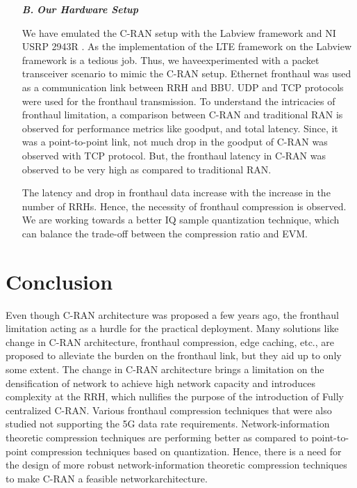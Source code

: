 \begin{multicols}{2}
\begin{itemize}
None of the above mentioned works have compared the performance of C-RAN with the traditional RAN. We have analyzed the performance\break difference in the following section.

\item[{\textit{\textbf{ B.}}}] {\textit{\textbf{Our Hardware Setup}}}

We have emulated the C-RAN setup with the Labview framework and NI USRP 2943R \cite{art3-key81}. As the implementation of the LTE framework on the Labview framework is a tedious job. Thus, we have\break experimented with a packet transceiver scenario to mimic the C-RAN setup. Ethernet fronthaul was used as a communication link between RRH and BBU. UDP and TCP protocols were used for the fronthaul transmission. To understand the intricacies of fronthaul limitation, a comparison between C-RAN and traditional RAN is observed for performance metrics like goodput, and total latency. Since, it was a point-to-point link, not much drop in the goodput of C-RAN was observed with TCP protocol. But, the fronthaul latency in C-RAN was observed to be very high as compared to traditional RAN.

The latency and drop in fronthaul data increase with the increase in the number of RRHs. Hence, the necessity of fronthaul compression is observed. We are working towards a better IQ sample quantization technique, which can balance the trade-off between the compression ratio and EVM.
\end{itemize}

\section{Conclusion}\label{sect08}

Even though C-RAN architecture was proposed a few years ago, the fronthaul limitation acting as a hurdle for the practical deployment. Many solutions like change in C-RAN architecture, fronthaul compression, edge caching, etc., are proposed to alleviate the burden on the fronthaul link, but they aid up to only some extent. The change in C-RAN architecture brings a limitation on the densification of network to achieve high network capacity and introduces complexity at the RRH, which nullifies the purpose of the introduction of Fully centralized C-RAN. Various fronthaul compression techniques that were also studied not supporting the 5G data rate requirements. Network-information theoretic compression techniques are performing better as compared to point-to-point compression techniques based on quantization. Hence, there is a need for the design of more robust network-information theoretic compression techniques to make C-RAN a feasible network\break architecture.


\end{multicols}
